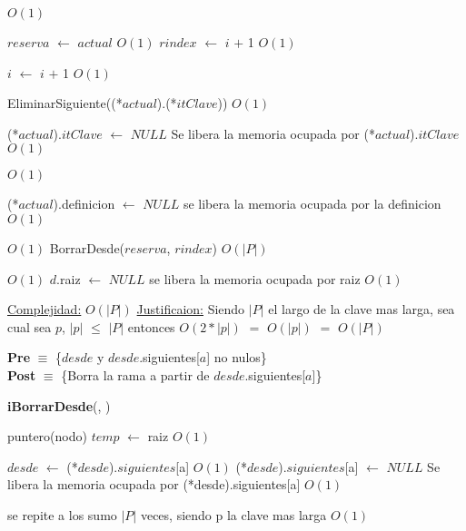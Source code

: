 \begin{Algoritmos}
\begin{algorithm}[H]
\begin{algorithmic}[1]
	 \Comment $O(1)$

	\State $reserva$ $\gets$ $actual$ \Comment $O(1)$
	\State $rindex$ $\gets$ $i$ $+$ 1 \Comment $O(1)$
	
	\EndIf

	\State $i$ $\gets$ $i$ $+$ 1 \Comment $O(1)$
\EndWhile 


\State EliminarSiguiente((*$actual$).(*$itClave$)) \Comment $O(1)$

\State (*$actual$).$itClave$ $\gets$ $NULL$ \Comment Se libera la memoria ocupada por (*$actual$).$itClave$ $O(1)$

 \Comment $O(1)$

	\State (*$actual$).definicion $\gets$ $NULL$ \Comment se libera la memoria ocupada por la definicion $O(1)$

\EndIf 

 \Comment $O(1)$
	\State BorrarDesde($reserva$, $rindex$) \Comment $O(|P|)$
\EndIf 


 \Comment $O(1)$
	\State $d$.raiz $\gets$ $NULL$ \Comment se libera la memoria ocupada por raiz $O(1)$
\EndIf 


\medskip
\State \underline{Complejidad:} $O(|P|)$
\State \underline{Justificaion:} Siendo $|P|$ el largo de la clave mas larga, sea cual sea $p$, $|p|$ $\leq$ $|P|$ entonces $O(2*|p|)$ $=$	$O(|p|)$ $=$ $O(|P|)$

\end{algorithmic}
\end{algorithm}
  
\pagebreak
  
\textbf{Pre} $\equiv$ \{$desde$ y $desde$.siguientes[$a$] no nulos\}\\%
\textbf{Post} $\equiv$ \{Borra la rama a partir de $desde$.siguientes[$a$]\}%

 
\begin{algorithm}[H]
{\textbf{iBorrarDesde}(}, )
\begin{algorithmic}[1]

\State puntero(nodo) $temp$ $\gets$ raiz \Comment $O(1)$

\State $desde$ $\gets$ (*$desde$).$siguientes$[a] \Comment $O(1)$
\State (*$desde$).$siguientes$[a] $\gets$ $NULL$ \Comment Se libera la memoria ocupada por (*desde).siguientes[a] $O(1)$

 \Comment se repite a los sumo $|P|$ veces, siendo p la clave mas larga $O(1)$


\end{algorithmic}
\end{algorithm}
\end{Algoritmos}
